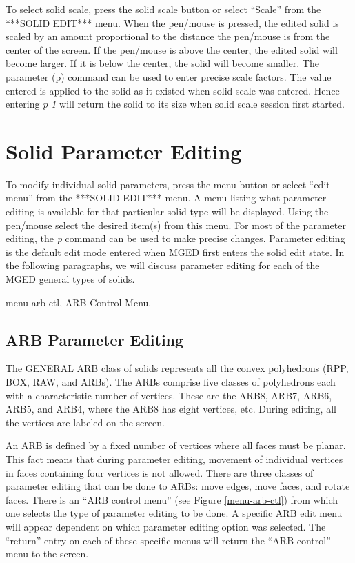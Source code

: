To select solid scale, press the solid scale button or select ``Scale''
from the ***SOLID EDIT*** menu.
When the pen/mouse is pressed, the edited solid is scaled by an amount
proportional to the distance the pen/mouse is from the center of the screen.
If the pen/mouse is above the center, the edited solid will become larger.
If it is below the center, the solid will become smaller.
The parameter (p) command can be used to enter precise scale factors.
The value entered is applied to the solid as it existed when solid
scale was entered.
Hence entering {\em p 1} will return the solid to its size when solid scale
session first started.

\section{Solid Parameter Editing}

To modify individual solid parameters, press the menu button or select
``edit menu'' from the ***SOLID EDIT*** menu.
A menu listing what parameter editing is available for that particular
solid type will be displayed.
Using the pen/mouse select the desired item(s) from this menu.
For most of the parameter editing, the {\em p} command can be used to
make precise changes.
Parameter editing is the default edit mode entered when MGED first
enters the solid edit state.
In the following paragraphs, we will discuss parameter editing
for each of the MGED general types of solids.

\mfig menu-arb-ctl, ARB Control Menu.

\subsection{ARB Parameter Editing}

The GENERAL ARB class of solids represents all the convex polyhedrons
(RPP, BOX, RAW, and ARBs).
The ARBs comprise five classes of polyhedrons each with a characteristic
number of vertices.
These are the ARB8, ARB7, ARB6, ARB5, and ARB4, where the ARB8 has
eight vertices, etc.
During editing, all the vertices are labeled on the screen.

An ARB is defined by a fixed number of vertices where all faces must
be planar.  This fact means that during parameter editing, movement
of individual vertices in faces containing four vertices is not allowed.
There are three classes of parameter editing that can be done to ARBs:
move edges,
move faces, and rotate faces.  There is an ``ARB control menu''
(see Figure \ref{menu-arb-ctl}) from
which one selects the type of parameter editing to be done.
A specific ARB edit menu will appear dependent on which parameter editing
option was selected.  The ``return'' entry on each of these specific menus
will return the ``ARB control'' menu to the screen.

